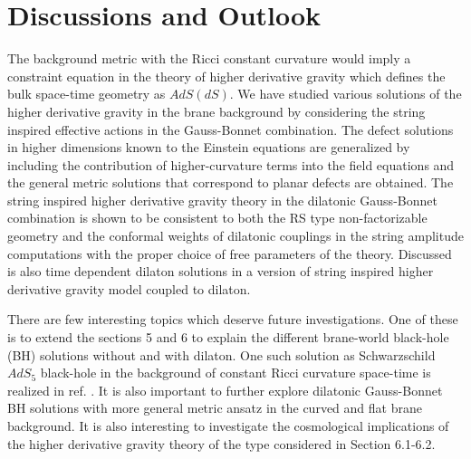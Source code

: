 \documentclass[a4paper,12pt]{article}
\begin{document}
\section{Discussions and Outlook}
The background metric with the Ricci constant curvature would imply  a 
constraint equation in the theory of higher derivative gravity which defines  
the bulk space-time geometry as $AdS(dS)$. We have studied various solutions 
of the higher derivative gravity in the brane background by considering the 
string inspired effective actions in the Gauss-Bonnet combination. The defect 
solutions in higher dimensions known to the Einstein equations are 
generalized by including the contribution of higher-curvature terms into 
the field equations and the general metric solutions that correspond to 
planar defects are obtained. The string inspired higher derivative gravity 
theory in the dilatonic Gauss-Bonnet combination is shown to be consistent 
to both the RS type non-factorizable geometry and the conformal weights of 
dilatonic couplings in the string amplitude computations with the proper 
choice of free parameters of the theory. Discussed is also time dependent 
dilaton solutions in a version of string inspired higher derivative gravity 
model coupled to dilaton.
 
There are few interesting topics which deserve future investigations. One 
of these is to extend the sections 5 and 6 to explain 
the different brane-world black-hole (BH) solutions without and with dilaton. 
One such solution as Schwarzschild $AdS_5$ black-hole in the background of 
constant Ricci curvature space-time is realized in ref. \cite{SNS}. 
It is also important to further explore dilatonic Gauss-Bonnet BH solutions 
with more general metric ansatz in the curved and flat brane background. It 
is also interesting to investigate the cosmological implications of the 
higher derivative gravity theory of the type considered in Section 6.1-6.2. 
\end{document}
